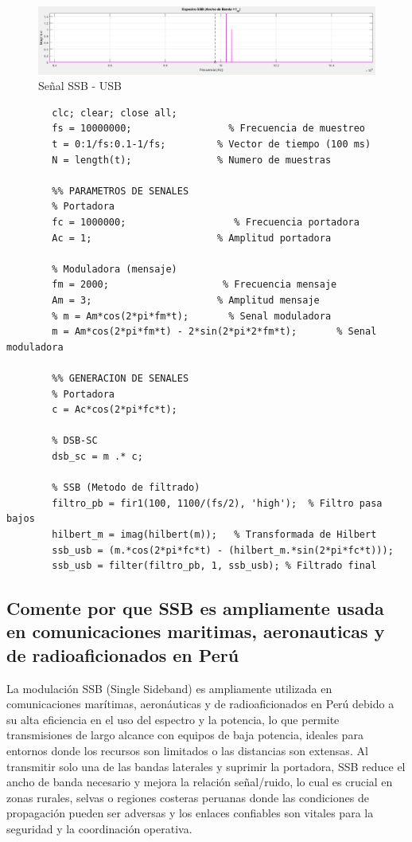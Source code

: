 \documentclass[conference]{IEEEtran}
\begin{document}
	\begin{figure}[h]
		\centering
		\includegraphics[width=0.4\linewidth]{media/ssb-usb}
		\caption{Señal SSB - USB}
		\label{fig:ssb-usb}
	\end{figure}
	\begin{lstlisting}[numbers=none]
		%% CONFIGURACION INICIAL
		clc; clear; close all;
		fs = 10000000;                 % Frecuencia de muestreo
		t = 0:1/fs:0.1-1/fs;         % Vector de tiempo (100 ms)
		N = length(t);               % Numero de muestras
		
		%% PARAMETROS DE SENALES
		% Portadora
		fc = 1000000;                   % Frecuencia portadora
		Ac = 1;                      % Amplitud portadora
		
		% Moduladora (mensaje)
		fm = 2000;                    % Frecuencia mensaje
		Am = 3;                      % Amplitud mensaje
		% m = Am*cos(2*pi*fm*t);       % Senal moduladora
		m = Am*cos(2*pi*fm*t) - 2*sin(2*pi*2*fm*t);       % Senal moduladora
		
		%% GENERACION DE SENALES
		% Portadora
		c = Ac*cos(2*pi*fc*t);
		
		% DSB-SC
		dsb_sc = m .* c;
		
		% SSB (Metodo de filtrado)
		filtro_pb = fir1(100, 1100/(fs/2), 'high');  % Filtro pasa bajos
		hilbert_m = imag(hilbert(m));   % Transformada de Hilbert
		ssb_usb = (m.*cos(2*pi*fc*t) - (hilbert_m.*sin(2*pi*fc*t)));
		ssb_usb = filter(filtro_pb, 1, ssb_usb); % Filtrado final
	\end{lstlisting}
	
	
	\subsection{Comente por que SSB es ampliamente usada en comunicaciones maritimas, aeronauticas y de radioaficionados en Perú}
	La modulación SSB (Single Sideband) es ampliamente utilizada en comunicaciones marítimas, aeronáuticas y de radioaficionados en Perú debido a su alta eficiencia en el uso del espectro y la potencia, lo que permite transmisiones de largo alcance con equipos de baja potencia, ideales para entornos donde los recursos son limitados o las distancias son extensas. Al transmitir solo una de las bandas laterales y suprimir la portadora, SSB reduce el ancho de banda necesario y mejora la relación señal/ruido, lo cual es crucial en zonas rurales, selvas o regiones costeras peruanas donde las condiciones de propagación pueden ser adversas y los enlaces confiables son vitales para la seguridad y la coordinación operativa.
	
		
	
	
\end{document}
